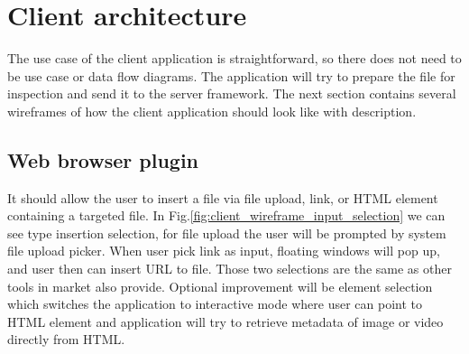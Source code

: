 

\chapter{Client architecture}

The use case of the client application is straightforward, so there does not need to be use case or data flow diagrams. The application will try to prepare the file for inspection and send it to the server framework. The next section contains several wireframes of how the client application should look like with description.

\section{Web browser plugin}

It should allow the user to insert a file via file upload, link, or HTML element containing a targeted file. In Fig.\ref{fig:client_wireframe_input_selection} we can see type insertion selection, for file upload the user will be prompted by system file upload picker. When user pick link as input, floating windows will pop up, and user then can insert URL to file. Those two selections are the same as other tools in market also provide. Optional improvement will be element selection which switches the application to interactive mode where user can point to HTML element and application will try to retrieve metadata of image or video directly from HTML. 

